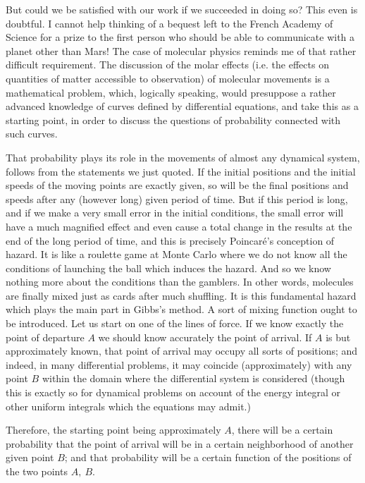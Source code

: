 \documentclass[12pt,oneside]{book}
\begin{document}
But could we be satisfied with our work if we succeeded in doing so? This even
is doubtful. I cannot help thinking of a bequest left to the French Academy of
Science for a prize to the first person who should be able to communicate with a
planet other than Mars! The case of molecular physics reminds me of that rather
difficult requirement. The discussion of the molar effects (i.e. the effects on
quantities of matter accessible to observation) of molecular movements is a
mathematical problem, which, logically speaking, would presuppose a rather
advanced knowledge of curves defined by differential equations, and take this as
a starting point, in order to discuss the questions of probability connected
with such curves. \par

That probability plays its role in the movements of almost any dynamical system,
follows from the statements we just quoted. If the initial positions and the
initial speeds of the moving points are exactly given, so will be the final
positions and speeds after any (however long) given period of time. But if this
period is long, and if we make a very small error in the initial conditions, the
small error will have a much magnified effect and even cause a total change in
the results at the end of the long period of time, and this is precisely
Poincar\'e's conception of hazard. It is like a roulette game at Monte Carlo
where we do not know all the conditions of launching the ball which induces the
hazard. And so we know nothing more about the conditions than the gamblers. In
other words, molecules are finally mixed just as cards after much shuffling. It
is this fundamental hazard which plays the main part in Gibbs's method. A sort
of mixing function ought to be introduced. Let us start on one of the lines of
force. If we know exactly the point of departure $A$ we should know accurately
the point of arrival. If $A$ is but approximately known, that point of arrival
may occupy all sorts of positions; and indeed, in many differential problems, it
may coincide (approximately) with any point $B$ within the domain where the
differential system is considered (though this is exactly so for dynamical
problems on account of the energy integral or other uniform integrals which the
equations may admit.) \par

Therefore, the starting point being approximately $A$, there will be a certain
probability that the point of arrival will be in a certain neighborhood of
another given point $B$; and that probability will be a certain function of the
positions of the two points $A,\ B$. \par
\end{document}
